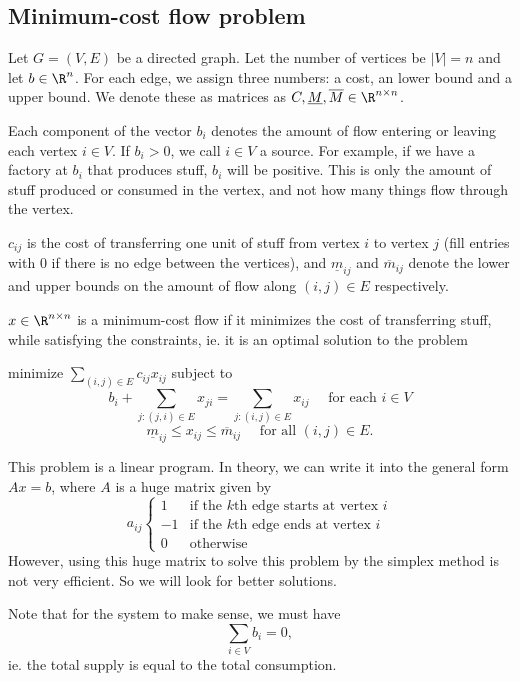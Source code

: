 \documentclass[a4paper]{article}
\begin{document}
\subsection{Minimum-cost flow problem}
Let $G = (V, E)$ be a directed graph. Let the number of vertices be $|V| = n$ and let $b\in \R^n$. For each edge, we assign three numbers: a cost, an lower bound and a upper bound. We denote these as matrices as $C, \underline{M}, \overline{M}\in \R^{n\times n}$.

Each component of the vector $b_i$ denotes the amount of flow entering or leaving each vertex $i\in V$. If $b_i > 0$, we call $i\in V$ a source. For example, if we have a factory at $b_i$ that produces stuff, $b_i$ will be positive. This is only the amount of stuff produced or consumed in the vertex, and not how many things flow through the vertex.

$c_{ij}$ is the cost of transferring one unit of stuff from vertex $i$ to vertex $j$ (fill entries with $0$ if there is no edge between the vertices), and $\underline{m}_{ij}$ and $\overline{m}_{ij}$ denote the lower and upper bounds on the amount of flow along $(i, j)\in E$ respectively.

$x\in \R^{n\times n}$ is a minimum-cost flow if it minimizes the cost of transferring stuff, while satisfying the constraints, ie. it is an optimal solution to the problem
\begin{center}
  minimize $\displaystyle\sum_{(i, j)\in E}c_{ij}x_{ij}$ subject to
  \[
    b_i + \sum_{j: (j, i)\in E} x_{ji} = \sum_{j: (i, j)\in E}x_{ij}\quad\text{ for each }i\in V
  \]
  \[
    \underline{m}_{ij} \leq x_{ij}\leq \overline{m}_{ij}\quad\text{ for all }(i, j) \in E.
  \]
\end{center}
This problem is a linear program. In theory, we can write it into the general form $Ax = b$, where $A$ is a huge matrix given by
\[
  a_{ij}
  \begin{cases}
    1 & \text{if the $k$th edge starts at vertex }i\\
    -1 & \text{if the $k$th edge ends at vertex }i\\
    0 & \text{otherwise}
  \end{cases}
\]
However, using this huge matrix to solve this problem by the simplex method is not very efficient. So we will look for better solutions.

Note that for the system to make sense, we must have
\[
  \sum_{i\in V}b_i = 0,
\]
ie. the total supply is equal to the total consumption.
\end{document}
